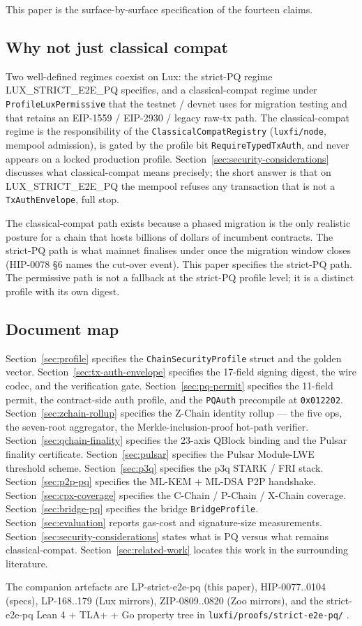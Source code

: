 This paper is the surface-by-surface specification of the fourteen claims.

\subsection{Why not just classical compat}

Two well-defined regimes coexist on Lux: the strict-PQ regime LUX\_STRICT\_E2E\_PQ
specifies, and a classical-compat regime under
\texttt{ProfileLuxPermissive} that the testnet / devnet uses for migration
testing and that retains an EIP-1559 / EIP-2930 / legacy raw-tx path. The
classical-compat regime is the responsibility of the
\texttt{ClassicalCompatRegistry} (\texttt{luxfi/node}, mempool admission), is
gated by the profile bit \texttt{RequireTypedTxAuth}, and never appears on a
locked production profile. Section~\ref{sec:security-considerations}
discusses what classical-compat means precisely; the short answer is that on
LUX\_STRICT\_E2E\_PQ the mempool refuses any transaction that is not a
\texttt{TxAuthEnvelope}, full stop.

The classical-compat path exists because a phased migration is the only
realistic posture for a chain that hosts billions of dollars of incumbent
contracts. The strict-PQ path is what mainnet finalises under once the
migration window closes (HIP-0078 §6 names the cut-over event). This paper
specifies the strict-PQ path. The permissive path is not a fallback at the
strict-PQ profile level; it is a distinct profile with its own digest.

\subsection{Document map}

Section~\ref{sec:profile} specifies the \texttt{ChainSecurityProfile} struct
and the golden vector. Section~\ref{sec:tx-auth-envelope} specifies the
17-field signing digest, the wire codec, and the verification gate.
Section~\ref{sec:pq-permit} specifies the 11-field permit, the contract-side
auth profile, and the \texttt{PQAuth} precompile at \texttt{0x012202}.
Section~\ref{sec:zchain-rollup} specifies the Z-Chain identity rollup --- the
five ops, the seven-root aggregator, the Merkle-inclusion-proof hot-path
verifier. Section~\ref{sec:qchain-finality} specifies the 23-axis QBlock
binding and the Pulsar finality certificate. Section~\ref{sec:pulsar}
specifies the Pulsar Module-LWE threshold scheme. Section~\ref{sec:p3q}
specifies the p3q STARK / FRI stack. Section~\ref{sec:p2p-pq} specifies the
ML-KEM + ML-DSA P2P handshake. Section~\ref{sec:cpx-coverage} specifies the
C-Chain / P-Chain / X-Chain coverage. Section~\ref{sec:bridge-pq} specifies
the bridge \texttt{BridgeProfile}. Section~\ref{sec:evaluation} reports
gas-cost and signature-size measurements. Section~\ref{sec:security-considerations}
states what is PQ versus what remains classical-compat.
Section~\ref{sec:related-work} locates this work in the surrounding
literature.

The companion artefacts are LP-strict-e2e-pq (this paper), HIP-0077..0104
(specs), LP-168..179 (Lux mirrors), ZIP-0809..0820 (Zoo mirrors), and
the strict-e2e-pq Lean 4 + TLA+ + Go property tree in
\texttt{luxfi/proofs/strict-e2e-pq/} \cite{luxstricte2epqproofs}.
